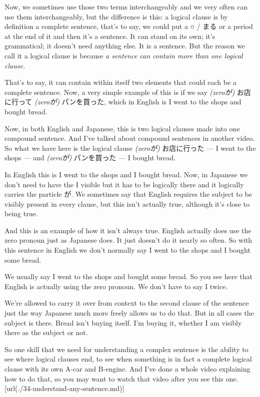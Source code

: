 Now, we sometimes use those two terms interchangeably and we very often can use them interchangeably, but the difference is this: a logical clause is by definition a complete sentence, that's to say, we could put a ○ / まる or a period at the end of it and then it's a sentence. It can stand on its own; it's grammatical; it doesn't need anything else. It is a sentence. But the reason we call it a logical clause is because {\em a sentence can contain more than one logical clause.}

That's to say, it can contain within itself two elements that could each be a complete sentence. Now, a very simple example of this is if we say {\em (zeroが)} お店に行って {\em (zeroが)} パンを買った, which in English is I went to the shops and bought bread.

{}

Now, in both English and Japanese, this is two logical clauses made into one compound sentence. And I've talked about compound sentences in another video. So what we have here is the logical clause {\em (zeroが)} お店に行った --- I went to the shops --- and {\em (zeroが)} パンを買った --- I bought bread.

In English this is I went to the shops and I bought bread. Now, in Japanese we don't need to have the I visible but it has to be logically there and it logically carries the particle が. We sometimes say that English requires the subject to be visibly present in every clause, but this isn't actually true, although it's close to being true.

And this is an example of how it isn't always true. English actually does use the zero pronoun just as Japanese does. It just doesn't do it nearly so often. So with this sentence in English we don't normally say I went to the shops and I bought some bread.

We usually say I went to the shops and bought some bread. So you see here that English is actually using the zero pronoun. We don't have to say I twice.

We're allowed to carry it over from context to the second clause of the sentence just the way Japanese much more freely allows us to do that. But in all cases the subject is there. Bread isn't buying itself. I'm buying it, whether I am visibly there as the subject or not.

So one skill that we need for understanding a complex sentence is the ability to see where logical clauses end, to see when something is in fact a complete logical clause with its own A-car and B-engine. And I've done a whole video explaining how to do that, so you may want to watch that video after you see this one.\goto{{[}34{]}}[url(./34-understand-any-sentence.md)]

